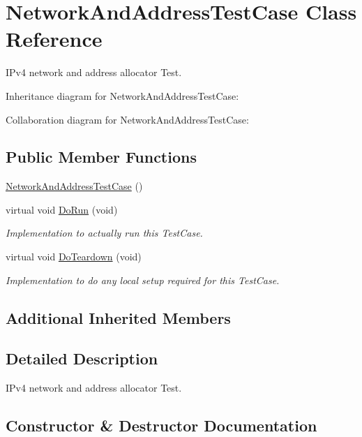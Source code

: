 \hypertarget{classNetworkAndAddressTestCase}{}\section{Network\+And\+Address\+Test\+Case Class Reference}
\label{classNetworkAndAddressTestCase}


I\+Pv4 network and address allocator Test.  




Inheritance diagram for Network\+And\+Address\+Test\+Case\+:


Collaboration diagram for Network\+And\+Address\+Test\+Case\+:
\subsection*{Public Member Functions}
\begin{DoxyCompactItemize}
\item 
\hyperlink{classNetworkAndAddressTestCase_a515cae516dc92caeb3e93cf654d0e3cc}{Network\+And\+Address\+Test\+Case} ()
\item 
virtual void \hyperlink{classNetworkAndAddressTestCase_ad98288b2e8ea829fe09a01bba3396e8b}{Do\+Run} (void)
\begin{DoxyCompactList}\small\item\em Implementation to actually run this Test\+Case. \end{DoxyCompactList}\item 
virtual void \hyperlink{classNetworkAndAddressTestCase_a047d961acbef00d3553530de20724ab5}{Do\+Teardown} (void)
\begin{DoxyCompactList}\small\item\em Implementation to do any local setup required for this Test\+Case. \end{DoxyCompactList}\end{DoxyCompactItemize}
\subsection*{Additional Inherited Members}


\subsection{Detailed Description}
I\+Pv4 network and address allocator Test. 

\subsection{Constructor \& Destructor Documentation}
